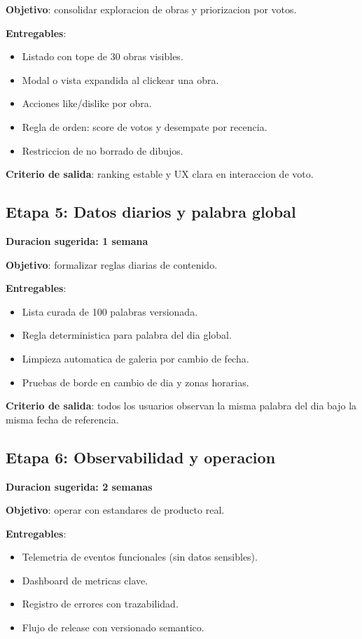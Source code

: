 \documentclass[12pt,a4paper]{article}
\begin{document}
\textbf{Objetivo}: consolidar exploracion de obras y priorizacion por votos.

\textbf{Entregables}:
\begin{itemize}
  \item Listado con tope de 30 obras visibles.
  \item Modal o vista expandida al clickear una obra.
  \item Acciones like/dislike por obra.
  \item Regla de orden: score de votos y desempate por recencia.
  \item Restriccion de no borrado de dibujos.
\end{itemize}

\textbf{Criterio de salida}: ranking estable y UX clara en interaccion de voto.

\subsection{Etapa 5: Datos diarios y palabra global}
\textbf{Duracion sugerida: 1 semana}

\textbf{Objetivo}: formalizar reglas diarias de contenido.

\textbf{Entregables}:
\begin{itemize}
  \item Lista curada de 100 palabras versionada.
  \item Regla deterministica para palabra del dia global.
  \item Limpieza automatica de galeria por cambio de fecha.
  \item Pruebas de borde en cambio de dia y zonas horarias.
\end{itemize}

\textbf{Criterio de salida}: todos los usuarios observan la misma palabra del dia bajo la misma fecha de referencia.

\subsection{Etapa 6: Observabilidad y operacion}
\textbf{Duracion sugerida: 2 semanas}

\textbf{Objetivo}: operar con estandares de producto real.

\textbf{Entregables}:
\begin{itemize}
  \item Telemetria de eventos funcionales (sin datos sensibles).
  \item Dashboard de metricas clave.
  \item Registro de errores con trazabilidad.
  \item Flujo de release con versionado semantico.
\end{itemize}
\end{document}
